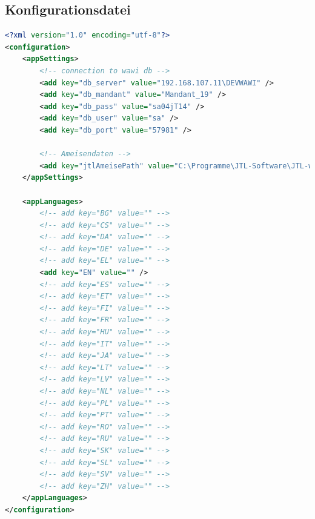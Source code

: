 \subsection{Konfigurationsdatei}
\label{sec:config}
\begin{lstlisting}[language=xml]
<?xml version="1.0" encoding="utf-8"?>
<configuration>
    <appSettings>
        <!-- connection to wawi db -->
        <add key="db_server" value="192.168.107.11\DEVWAWI" />
        <add key="db_mandant" value="Mandant_19" />
        <add key="db_pass" value="sa04jT14" />
        <add key="db_user" value="sa" />
        <add key="db_port" value="57981" />

        <!-- Ameisendaten -->
        <add key="jtlAmeisePath" value="C:\Programme\JTL-Software\JTL-wawi-ameise.exe" />
    </appSettings>

    <appLanguages>
        <!-- add key="BG" value="" -->
        <!-- add key="CS" value="" -->
        <!-- add key="DA" value="" -->
        <!-- add key="DE" value="" -->
        <!-- add key="EL" value="" -->
        <add key="EN" value="" />
        <!-- add key="ES" value="" -->
        <!-- add key="ET" value="" -->
        <!-- add key="FI" value="" -->
        <!-- add key="FR" value="" -->
        <!-- add key="HU" value="" -->
        <!-- add key="IT" value="" -->
        <!-- add key="JA" value="" -->
        <!-- add key="LT" value="" -->
        <!-- add key="LV" value="" -->
        <!-- add key="NL" value="" -->
        <!-- add key="PL" value="" -->
        <!-- add key="PT" value="" -->
        <!-- add key="RO" value="" -->
        <!-- add key="RU" value="" -->
        <!-- add key="SK" value="" -->
        <!-- add key="SL" value="" -->
        <!-- add key="SV" value="" -->
        <!-- add key="ZH" value="" -->
    </appLanguages>
</configuration>
\end{lstlisting}


\newpage
